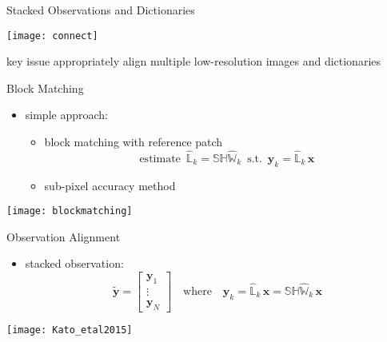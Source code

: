 \documentclass[fleqn,aspectratio=1610]{beamer}
\begin{document}
\begin{frame}[label={sec:orga00967a}]{Stacked Observations and Dictionaries}
\begin{center}
\texttt{[image: connect]}
\end{center}
\begin{alertblock}{key issue}
appropriately align multiple low-resolution images and dictionaries
\end{alertblock}
\end{frame}

\begin{frame}[label={sec:org166b886}]{Block Matching}
\begin{itemize}
\item simple approach:
\parencite{KatoHinoMurata2015}
\begin{itemize}
\item block matching with reference patch
\begin{equation}
  \text{estimate }\,
  \hat{\mathbb{L}}_k =\mathbb{SH}\hat{\mathbb{W}}_{k}
  \,\text{ s.t. }\,
  \boldsymbol{y}_k = \hat{\mathbb{L}}_k\,\boldsymbol{x}
\end{equation}
\item sub-pixel accuracy method
\parencite{ShimizuOkutomi2006}
\end{itemize}
\end{itemize}
\begin{center}
\texttt{[image: blockmatching]}
\end{center}
\end{frame}

\begin{frame}[label={sec:org10b0687}]{Observation Alignment}
\begin{itemize}
\item stacked observation:
\begin{equation}
  \tilde{\boldsymbol{y}}
  =
  \begin{bmatrix}
    \boldsymbol{y}_{1}\\\vdots\\\boldsymbol{y}_{N}
  \end{bmatrix}
  \quad\text{where}\quad
  \boldsymbol{y}_{k}
  =\hat{\mathbb{L}}_{k}\,\boldsymbol{x}
  =\mathbb{SH}\hat{\mathbb{W}}_{k}\,\boldsymbol{x}
\end{equation}
\end{itemize}
\begin{center}
\texttt{[image: Kato\_etal2015]}
\end{center}
\end{frame}
\end{document}
